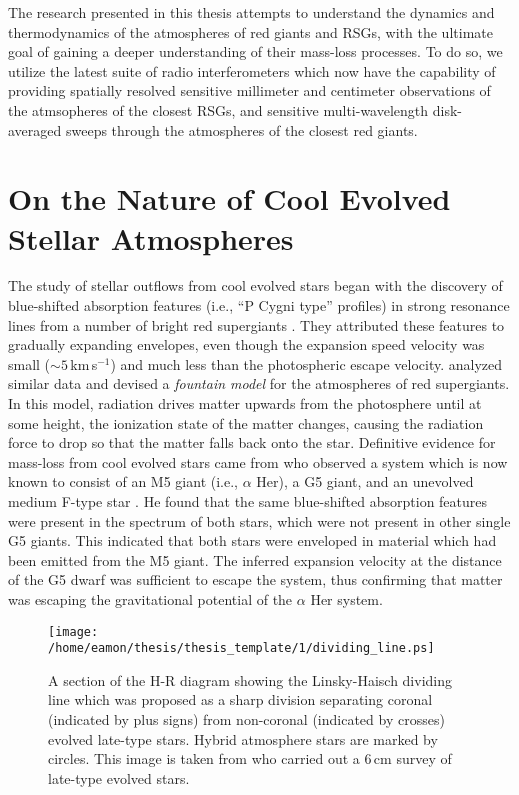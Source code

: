 The research presented in this thesis attempts to understand the dynamics and thermodynamics of the atmospheres of red giants and RSGs, with the ultimate goal of gaining a deeper understanding of their mass-loss processes. To do so, we utilize the latest suite of radio interferometers which now have the capability of providing spatially resolved sensitive millimeter and centimeter observations of the atmsopheres of the closest RSGs, and sensitive multi-wavelength disk-averaged sweeps through the atmospheres of the closest red giants.

\section{On the Nature of Cool Evolved Stellar Atmospheres}\label{sec:1.2}
The study of stellar outflows from cool evolved stars began with the discovery of blue-shifted absorption features (i.e., ``P Cygni type'' profiles) in strong resonance lines from a number of bright red supergiants \citep{adams_1935}. They attributed these features to gradually expanding envelopes, even though the expansion speed velocity was small ($\sim 5$\,km\,s$^{-1}$) and much less than the photospheric escape velocity. \cite{spitzer_1939} analyzed similar data and devised a \textit{fountain model} for the atmospheres of red supergiants. In this model, radiation drives matter upwards from the photosphere until at some height, the ionization state of the matter changes, causing the radiation force to drop so that the matter falls back onto the star. Definitive evidence for mass-loss from cool evolved stars came from \cite{deutsch_1956} who observed a system which is now known to consist of an M5 giant (i.e., $\alpha$ Her), a G5 giant, and an unevolved medium F-type star \citep{reimers_1977}. He found that the same blue-shifted absorption features were present in the spectrum of both stars, which were not present in other single G5 giants. This indicated that both stars were enveloped in material which had been emitted from the M5 giant. The inferred expansion velocity at the distance of the G5 dwarf was sufficient to escape the system, thus confirming that matter was escaping the gravitational potential of the $\alpha$ Her system.

\begin{figure}[hbt!]
\centering 
          \texttt{[image: /home/eamon/thesis/thesis\_template/1/dividing\_line.ps]}
\caption[The Linsky-Haisch dividing line]{A section of the H-R diagram showing the Linsky-Haisch dividing line which was proposed as a sharp division separating coronal (indicated by plus signs) from non-coronal (indicated by crosses) evolved late-type stars. Hybrid atmosphere stars are marked by circles. This image is taken from \cite{drake_1986} who carried out a 6\,cm survey of late-type evolved stars.}
\label{fig:1.2.1}
\end{figure}


